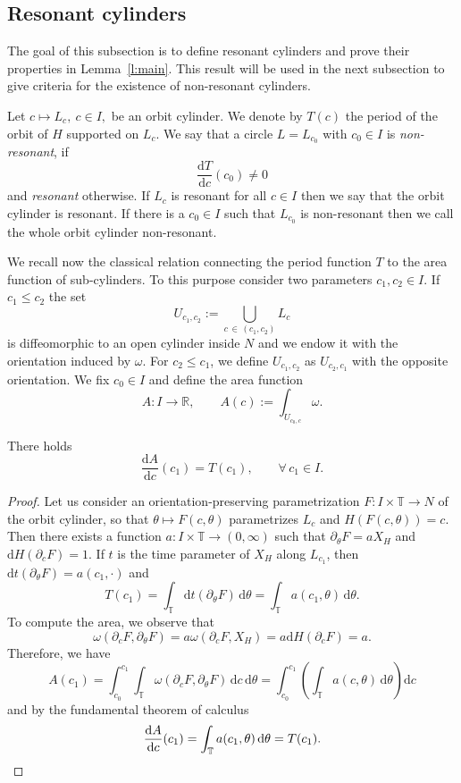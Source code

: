 \documentclass[AHL,Unicode,longabstracts,published]{cedram}
\newcommand{\R}{\mathbb{R}}
\newcommand{\T}{\mathbb{T}}
\newcommand{\diff}{\mathrm{d}}
\newcommand{\p}{\partial}
\let\oldforall\forall
\renewcommand*{\forall}{\mathrel{\oldforall}}
\begin{document}
\subsection{Resonant cylinders}\label{ss:res}
The goal of this subsection is to define resonant cylinders and prove their properties in Lemma~\ref{l:main}. This result will be used in the next subsection to give criteria for the existence of non-resonant cylinders.

\begin{defi}
Let $c\mapsto L_c, \ c\in I,$ be an orbit cylinder. We denote by $T(c)$ the period of the orbit of $H$ supported on $L_c$. We say that a circle $L=L_{c_0}$ with $c_0\in I$ is \emph{non-resonant}, if
\[
\frac{\diff T}{\diff c}(c_0)\neq0
\]
and \emph{resonant} otherwise. If $L_c$ is resonant for all $c\in I$ then we say that the orbit cylinder is resonant. If there is a $c_0\in I$ such that $L_{c_0}$ is non-resonant then we call the whole orbit cylinder non-resonant.
\end{defi}

We recall now the classical relation connecting the period function $T$ to the area function of sub-cylinders. To this purpose consider two parameters $c_1,c_2\in I$. If $c_1\leq c_2$ the set
\[
U_{c_1,c_2}:=\bigcup_{c\,\in\,\left(c_1,c_2\right)}L_c
\]
is diffeomorphic to an open cylinder inside $N$ and we endow it with the orientation induced by $\omega$. For $c_2\leq c_1$, we define $U_{c_1,c_2}$ as $U_{c_2,c_1}$ with the opposite orientation. We fix $c_0\in I$ and define the area function
\[
A:I\to\R,\qquad A(c):=\int_{U_{c_0,c}}\omega.
\]

\begin{lemm}\label{l:ap}
There holds
\[
\frac{\diff A}{\diff c}(c_1)=T(c_1),\qquad\forall\,c_1\in I.
\]
\end{lemm}

\begin{proof}
Let us consider an orientation-preserving parametrization $F:I\times\T\to N$ of the orbit cylinder, so that $\theta\mapsto F(c,\theta)$ parametrizes $L_c$ and $H(F(c,\theta))=c$. Then there exists a function $a:I\times\T\to(0,\infty)$ such that $\p_\theta F=aX_H$ and $\diff H(\p_c F)=1$. If $t$ is the time parameter of $X_H$ along $L_{c_1}$, then $\diff t(\p_\theta F)=a(c_1,\cdot)$ and
\[
T(c_1)=\int_{\T}\diff t\!\left(\p_\theta F\right)\,\diff\theta=\int_{\T}a\!\left(c_1,\theta\right)\,\diff\theta.
\]
To compute the area, we observe that
\[
\omega\!\left(\p_c F,\p_\theta F\right)=a\omega\!\left(\p_c F,X_H\right)=a\diff H\!\left(\p_c F\right)=a.
\]
Therefore, we have
\[
A(c_1)=\int_{c_0}^{c_1}\int_{\T}\omega\!\left(\p_c F,\p_\theta F\right)\,\diff c\,\diff\theta=\int_{c_0}^{c_1}\left(\int_{\T}a\!\left(c,\theta\right)\,\diff\theta\right)\diff c
\]
and by the fundamental theorem of calculus
\[
\frac{\diff A}{\diff c}(c_1)=\int_\T a(c_1,\theta)\,\diff\theta=T(c_1).\qedhere
\]
\end{proof}
\end{document}
